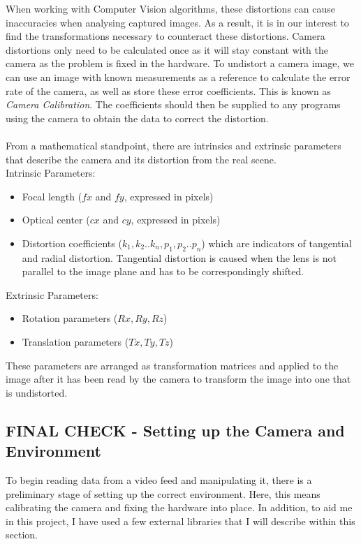 \documentclass[11pt]{article}
\begin{document}
When working with Computer Vision algorithms, these distortions can cause
inaccuracies when analysing captured images. 
As a result, it is in our interest to find the transformations
necessary to counteract these distortions. Camera distortions only need to be 
calculated once as it will stay constant with the camera as the problem
is fixed in the hardware.
To undistort a camera image, we can use an image with known measurements 
as a reference to calculate the error rate of the camera, as well as
store these error coefficients. This is known as \textit{Camera Calibration}.
The coefficients should then be supplied
to any programs using the camera to obtain the data to correct the distortion.\\
\\
From a mathematical standpoint, there are intrinsics and extrinsic parameters
that describe the camera and its distortion from the real scene.\\
Intrinsic Parameters:
\begin{itemize}
	\item Focal length ($fx$ and $fy$, expressed in pixels)
	\item Optical center ($cx$ and $cy$, expressed in pixels)
	\item Distortion coefficients ($k_{1},k_{2}..k_{n}, p_{1},p_{2}..p_{n}$) which are
		indicators of tangential and radial distortion. Tangential distortion
		is caused when the lens is not parallel to the image plane and
		has to be correspondingly shifted. 
\end{itemize}

Extrinsic Parameters:
\begin{itemize}
	\item Rotation parameters ($Rx, Ry, Rz$)
	\item Translation parameters ($Tx, Ty, Tz$)
\end{itemize}

These parameters are arranged as transformation matrices and applied to the
image after it has been read by the camera to transform the image into
one that is undistorted.

\subsection{FINAL CHECK - Setting up the Camera and Environment}
To begin reading data from a video feed and manipulating it, there 
is a preliminary stage of setting up the correct environment. Here,
this means calibrating the camera and fixing the hardware into place.
In addition, to aid me in this project, I have used a few external
libraries that I will describe within this section.
\end{document}
